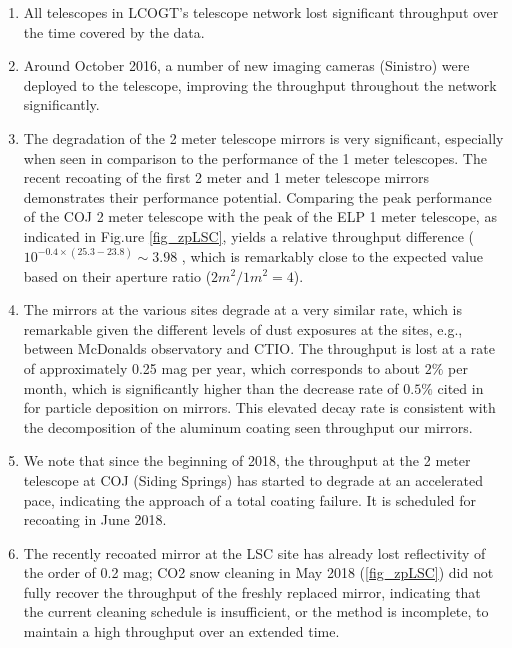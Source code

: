 \documentclass[draft]{spieman}
\begin{document}
\begin{enumerate}
\item All telescopes in LCOGT's telescope network lost significant throughput over the time covered
 by the data. 

\item Around October 2016, a number of new imaging cameras (Sinistro) were deployed to the 
telescope, improving the throughput throughout the network significantly.

\item The degradation of the 2 meter telescope mirrors is very significant, especially when seen in
comparison to the performance of the 1 meter telescopes. The recent recoating of the first 2 meter
and 1 meter telescope mirrors demonstrates their  performance potential. Comparing the peak 
performance of the COJ 2 meter telescope with the peak of the ELP 1 meter telescope, as indicated 
in Fig.ure \ref{fig_zpLSC}, yields a  relative throughput difference  ($10^{-0.4\times (25.3-23.8)} 
\sim 3.98$ , which is remarkably close to the expected value based on their aperture ratio 
($2m^2/1m^2 = 4$).

\item The mirrors at the various sites degrade at a very similar rate, which is remarkable given the
different levels of dust exposures at the sites, e.g., between McDonalds observatory and CTIO. The
throughput is lost at a rate of approximately 0.25 mag per year, which corresponds to about $2 \%$
per month, which is significantly higher than the decrease rate of $0.5\%$ cited in
\cite{designolt,benn2000} for particle deposition on mirrors. This elevated decay rate is 
consistent with the decomposition of the aluminum coating seen throughput our mirrors.

\item We note that since the beginning of 2018, the throughput at the 2 meter telescope at COJ 
(Siding Springs) has started to degrade at an accelerated pace, indicating the approach of a total 
coating failure. It is scheduled for recoating in June 2018.

\item The recently recoated mirror at the LSC site has already lost reflectivity of the order of 0.2
mag; CO2 snow cleaning in May 2018 (\ref{fig_zpLSC}) did not fully recover the throughput of the
freshly replaced mirror,  indicating that the current cleaning schedule is insufficient, or the
method is incomplete, to maintain a high throughput over an extended time.
\end{enumerate}
\end{document}
